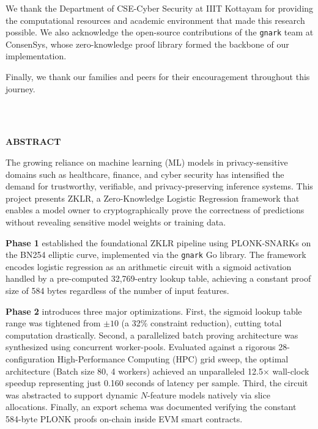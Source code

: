\documentclass[12pt,a4wide]{report}
\begin{document}
We thank the Department of CSE-Cyber Security at IIIT Kottayam for providing the computational resources and academic environment that made this research possible. We also acknowledge the open-source contributions of the \texttt{gnark} team at ConsenSys, whose zero-knowledge proof library formed the backbone of our implementation.

Finally, we thank our families and peers for their encouragement throughout this journey.

\vspace{3cm}
\hspace*{\fill}{\large Santhosh Cheemala (2022BCY0009)}\\
\hspace*{\fill}{\large Shravasti Ohol (2022BCY0012)}\\
\hspace*{\fill}{\large Buddala Kamalakar (2022BCY0050)}

\clearpage

\begin{center}
{\Large\bf ABSTRACT}
\end{center}

The growing reliance on machine learning (ML) models in privacy-sensitive domains such as healthcare, finance, and cyber security has intensified the demand for trustworthy, verifiable, and privacy-preserving inference systems. This project presents ZKLR, a Zero-Knowledge Logistic Regression framework that enables a model owner to cryptographically prove the correctness of predictions without revealing sensitive model weights or training data.

\textbf{Phase 1} established the foundational ZKLR pipeline using PLONK-SNARKs on the BN254 elliptic curve, implemented via the \texttt{gnark} Go library. The framework encodes logistic regression as an arithmetic circuit with a sigmoid activation handled by a pre-computed 32,769-entry lookup table, achieving a constant proof size of 584 bytes regardless of the number of input features.

\textbf{Phase 2} introduces three major optimizations. First, the sigmoid lookup table range was tightened from $\pm10$ (a 32\% constraint reduction), cutting total computation drastically. Second, a parallelized batch proving architecture was synthesized using concurrent worker-pools. Evaluated against a rigorous 28-configuration High-Performance Computing (HPC) grid sweep, the optimal architecture (Batch size 80, 4 workers) achieved an unparalleled 12.5$\times$ wall-clock speedup representing just 0.160 seconds of latency per sample. Third, the circuit was abstracted to support dynamic $N$-feature models natively via slice allocations. Finally, an export schema was documented verifying the constant 584-byte PLONK proofs on-chain inside EVM smart contracts.
\end{document}
